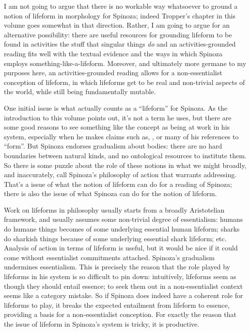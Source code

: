 \documentclass{article}
\newcommand{\dash}{\unskip{—}}
\begin{document}
I am not going to argue that there is no workable way whatsoever to ground a notion of lifeform in morphology for Spinoza; indeed Tropper's chapter in this volume goes somewhat in that direction. Rather, I am going to argue for an alternative possibility: there are useful resources for grounding lifeform to be found in activities \dash the stuff that singular things \emph{do} \dash and an activities-grounded reading fits well with the textual evidence and the ways in which Spinoza employs something-like-a-lifeform. Moreover, and ultimately more germane to my purposes here, an activities-grounded reading allows for a non-essentialist conception of lifeform, in which lifeforms get to be real and non-trivial aspects of the world, while still being fundamentally mutable.

One initial issue is what actually counts as a \enquote{lifeform} for Spinoza. As the introduction to this volume points out, it's not a term he uses, but there are some good reasons to see something like the concept as being at work in his system, especially when he makes claims such as, , or many of his references to \enquote{form}. But Spinoza endorses gradualism about bodies: there are no hard boundaries between natural kinds, and no ontological resources to institute them. So there is some puzzle about the role of these notions in what we might broadly, and inaccurately, call Spinoza's philosophy of action that warrants addressing. That's a issue of what the notion of lifeform can do for a reading of Spinoza; there is also the issue of what Spinoza can do for the notion of lifeform.

Work on lifeforms in philosophy usually starts from a broadly Aristotelian framework, and usually assumes some non-trivial degree of essentialism: humans do humane things becomes of some underlying essential human lifeform; sharks do sharkish things because of some underlying essential shark lifeform; etc. Analysis of action in terms of lifeform is useful, but it would be nice if it could come without essentialist commitments attached. Spinoza's gradualism undermines essentialism. This is precisely the reason that the role played by lifeforms in his system is so difficult to pin down: intuitively, lifeforms seem as though they should entail essence; to seek them out in a non-essentialist context seems like a category mistake. So if Spinoza does indeed have a coherent role for lifeforms to play, it breaks the expected entailment from lifeform to essence, providing a basis for a non-essentialist conception. For exactly the reason that the issue of lifeform in Spinoza's system is tricky, it is productive.
\end{document}
